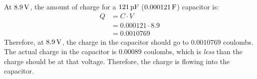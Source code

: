 \begin{enumerate}
{At $8.9\,\si{\volt}$, the amount of charge for a $121\,\si{\micro\farad}$ ($0.000121\,\si{\farad}$) capacitor is:
\begin{align*}
Q &= C \cdot V \\
  &= 0.000121 \cdot 8.9 \\
  &= 0.0010769
\end{align*}
Therefore, at $8.9\,\si{\volt}$, the charge in the capacitor should go to $0.0010769$ coulombs.
The actual charge in the capacitor is $0.00089$ coulombs, which is \emph{less} than the charge should be at that voltage.
Therefore, the charge is flowing into the capacitor.
}
\end{enumerate}
